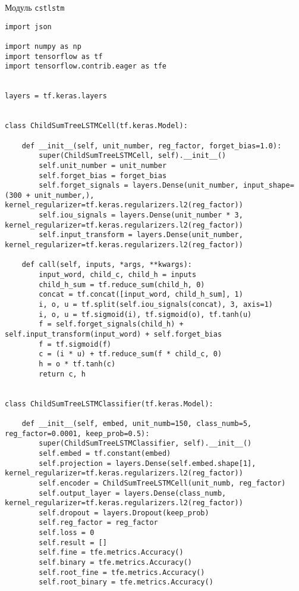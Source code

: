 \appendix


\begin{center}Модуль \texttt{cstlstm}\end{center}

\begin{lstlisting}[style=app]
import json

import numpy as np
import tensorflow as tf
import tensorflow.contrib.eager as tfe


layers = tf.keras.layers


class ChildSumTreeLSTMCell(tf.keras.Model):

    def __init__(self, unit_number, reg_factor, forget_bias=1.0):
        super(ChildSumTreeLSTMCell, self).__init__()
        self.unit_number = unit_number
        self.forget_bias = forget_bias
        self.forget_signals = layers.Dense(unit_number, input_shape=(300 + unit_number,), kernel_regularizer=tf.keras.regularizers.l2(reg_factor))
        self.iou_signals = layers.Dense(unit_number * 3, kernel_regularizer=tf.keras.regularizers.l2(reg_factor))
        self.input_transform = layers.Dense(unit_number, kernel_regularizer=tf.keras.regularizers.l2(reg_factor))

    def call(self, inputs, *args, **kwargs):
        input_word, child_c, child_h = inputs
        child_h_sum = tf.reduce_sum(child_h, 0)
        concat = tf.concat([input_word, child_h_sum], 1)
        i, o, u = tf.split(self.iou_signals(concat), 3, axis=1)
        i, o, u = tf.sigmoid(i), tf.sigmoid(o), tf.tanh(u)
        f = self.forget_signals(child_h) + self.input_transform(input_word) + self.forget_bias
        f = tf.sigmoid(f)
        c = (i * u) + tf.reduce_sum(f * child_c, 0)
        h = o * tf.tanh(c)
        return c, h


class ChildSumTreeLSTMClassifier(tf.keras.Model):

    def __init__(self, embed, unit_numb=150, class_numb=5, reg_factor=0.0001, keep_prob=0.5):
        super(ChildSumTreeLSTMClassifier, self).__init__()
        self.embed = tf.constant(embed)
        self.projection = layers.Dense(self.embed.shape[1], kernel_regularizer=tf.keras.regularizers.l2(reg_factor))
        self.encoder = ChildSumTreeLSTMCell(unit_numb, reg_factor)
        self.output_layer = layers.Dense(class_numb, kernel_regularizer=tf.keras.regularizers.l2(reg_factor))
        self.dropout = layers.Dropout(keep_prob)
        self.reg_factor = reg_factor
        self.loss = 0
        self.result = []
        self.fine = tfe.metrics.Accuracy()
        self.binary = tfe.metrics.Accuracy()
        self.root_fine = tfe.metrics.Accuracy()
        self.root_binary = tfe.metrics.Accuracy()


\end{lstlisting}

